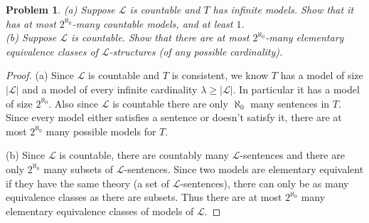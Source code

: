 \documentclass{article}
\newtheorem{problem}{Problem}
\begin{document}
\begin{problem}
(a) Suppose $\mathcal{L}$ is countable and $T$ has infinite models. Show that it has at most $2^{\aleph_0}$-many countable models, and at least $1$.\\
(b) Suppose $\mathcal{L}$ is countable. Show that there are at most $2^{\aleph_0}$-many elementary equivalence classes of $\mathcal{L}$-structures (of any possible cardinality).
\end{problem}
\begin{proof}
(a) Since $\mathcal{L}$ is countable and $T$ is consistent, we know $T$ has a model of size $|\mathcal{L}|$ and a model of every infinite cardinality $\lambda \geq |\mathcal{L}|$. In particular it has a model of size $2^{\aleph_0}$. Also since $\mathcal{L}$ is countable there are only $\aleph_0$ many sentences in $T$. Since every model either satisfies a sentence or doesn't satisfy it, there are at most $2^{\aleph_0}$ many possible models for $T$.

(b) Since $\mathcal{L}$ is countable, there are countably many $\mathcal{L}$-sentences and there are only $2^{\aleph_0}$ many subsets of $\mathcal{L}$-sentences. Since two models are elementary equivalent if they have the same theory (a set of $\mathcal{L}$-sentences), there can only be as many equivalence classes as there are subsets. Thus there are at most $2^{\aleph_0}$ many elementary equivalence classes of models of $\mathcal{L}$.
\end{proof}
\end{document}
